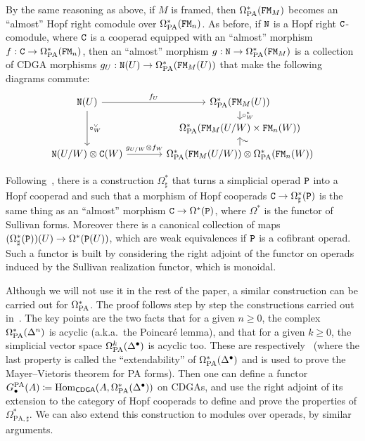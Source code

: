 By the same reasoning as above, if $M$ is framed, then $\Omega_{\mathrm{PA}}^{*}(\mathtt{FM}_{M})$ becomes an ``almost'' Hopf right comodule over $\Omega_{\mathrm{PA}}^{*}(\mathtt{FM}_{n})$.
As before, if $\mathtt{N}$ is a Hopf right $\mathtt{C}$-comodule, where $\mathtt{C}$ is a cooperad equipped with an ``almost'' morphism $f : \mathtt{C} \to \Omega_{\mathrm{PA}}^{*}(\mathtt{FM}_{n})$, then an ``almost'' morphism $g : \mathtt{N} \to \Omega_{\mathrm{PA}}^{*}(\mathtt{FM}_{M})$ is a collection of CDGA morphisms $g_{U} : \mathtt{N}(U) \to \Omega_{\mathrm{PA}}^{*}(\mathtt{FM}_{M}(U))$ that make the following diagrams commute:
\[ \begin{tikzcd}[column sep = large, row sep = small]
    \NN(U) \ar{r}{f_{U}} \ar{dd}{\circ_{W}^{\vee}} & \OmPA^{*}(\FM_{M}(U)) \ar{d}{\circ_{W}^{*}} \\
    {} & \OmPA^{*}(\FM_{M}(U/W) \times \FM_{n}(W)) \\
    \NN(U/W) \otimes \CC(W) \ar{r}{g_{U/W} \otimes f_{W}} & \OmPA^{*}(\FM_{M}(U/W)) \otimes \OmPA^{*}(\FM_{n}(W)) \ar{u}[swap]{\sim}
  \end{tikzcd} \]

\begin{remark}
  Following~\cite[Section II.10.1]{Fresse2017}, there is a construction $\Omega^{*}_{\sharp}$ that turns a simplicial operad $\mathtt{P}$ into a Hopf cooperad and such that a morphism of Hopf cooperads $\mathtt{C} \to \Omega^{*}_{\sharp}(\mathtt{P})$ is the same thing as an ``almost'' morphism $\mathtt{C} \to \Omega^{*}(\mathtt{P})$, where $\Omega^{*}$ is the functor of Sullivan forms.
  Moreover there is a canonical collection of maps $(\Omega^{*}_{\sharp}(\mathtt{P}))(U) \to \Omega^{*}(\mathtt{P}(U))$, which are weak equivalences if $\mathtt{P}$ is a cofibrant operad.
  Such a functor is built by considering the right adjoint of the functor on operads induced by the Sullivan realization functor, which is monoidal.

  Although we will not use it in the rest of the paper, a similar construction can be carried out for $\Omega_{\mathrm{PA}}^{*}$.
  The proof follows step by step the constructions carried out in~\cite[Section II.10.1]{Fresse2017}.
  The key points are the two facts that for a given $n \geq 0$, the complex $\Omega_{\mathrm{PA}}^{*}(\Delta^{n})$ is acyclic (a.k.a.\ the Poincaré lemma), and that for a given $k \geq 0$, the simplicial vector space $\Omega_{\mathrm{PA}}^{k}(\Delta^{\bullet})$ is acyclic too.
  These are respectively~\cite[Lemma~6.3 and Lemma~6.10]{HardtLambrechtsTurchinVolic2011} (where the last property is called the ``extendability'' of $\Omega_{\mathrm{PA}}^{*}(\Delta^{\bullet})$ and is used to prove the Mayer--Vietoris theorem for PA forms).
  Then one can define a functor $G_{\bullet}^{\mathrm{PA}}(A) \coloneqq \operatorname{Hom}_{\mathsf{CDGA}}(A, \Omega_{\mathrm{PA}}^{*}(\Delta^{\bullet}))$ on CDGAs, and use the right adjoint of its extension to the category of Hopf cooperads to define and prove the properties of $\Omega^{*}_{\mathrm{PA}, \sharp}$.
  We can also extend this construction to modules over operads, by similar arguments.
\end{remark}

